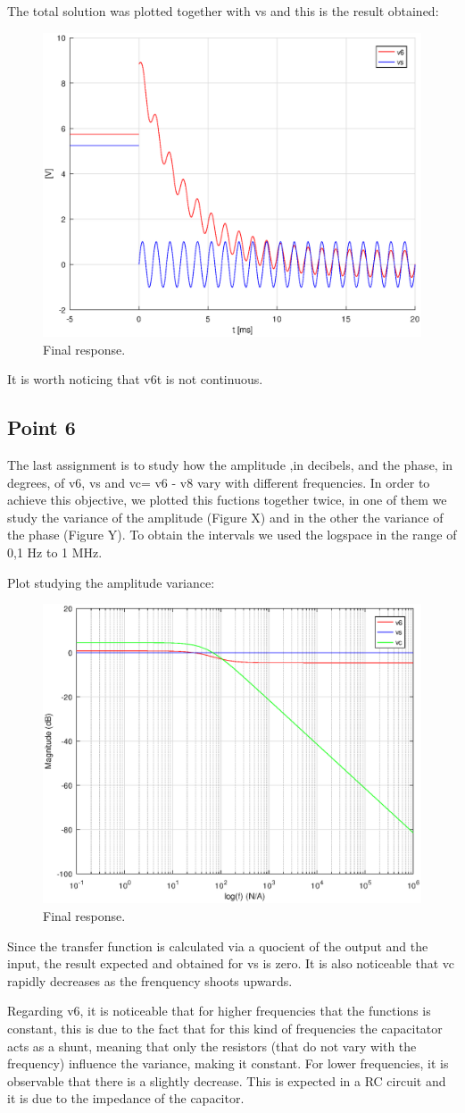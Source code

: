 The total solution was plotted together with vs and this is the result obtained:

\begin{figure}[H] \centering
\includegraphics[width=0.6\linewidth]{Theoretical5.eps}
\caption{Final response.}
\label{fig:point5}
\end{figure}

It is worth noticing that v6t is not continuous.

\subsection{Point 6}
The last assignment is to study how the amplitude ,in decibels, and the phase, in degrees, of v6, vs and vc= v6 - v8 vary with different frequencies. In order to achieve this objective, we plotted this fuctions together twice, in one of them we study the variance of the amplitude (Figure X) and in the other the variance of the phase (Figure Y). To obtain the intervals we used the logspace in the range of 0,1 Hz to 1 MHz.
\par Plot studying the amplitude variance:
\begin{figure}[H] \centering
\includegraphics[width=0.6\linewidth]{freq6SC.eps}
\caption{Final response.}
\label{fig:point61}
\end{figure}
Since the transfer function is calculated via a quocient of the output and the input, the result expected and obtained for vs is zero.
It is also noticeable that vc rapidly decreases as the frenquency shoots upwards.\par
Regarding v6, it is noticeable that for higher frequencies that the functions is constant, this is due to the fact that for this kind of frequencies the capacitator
acts as a shunt, meaning that only the resistors (that do not vary with the frequency) influence the variance, making it constant. For lower frequencies, it is observable that
there is a slightly decrease. This is expected in a RC circuit and it is due to the impedance of the capacitor.

